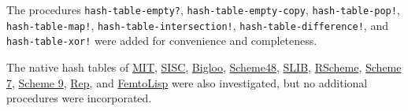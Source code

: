 The procedures \texttt{hash-table-empty?},
\texttt{hash-table-empty-copy}, \texttt{hash-table-pop!},
\texttt{hash-table-map!}, \texttt{hash-table-intersection!},
\texttt{hash-table-difference!}, and \texttt{hash-table-xor!} were added
for convenience and completeness.

The native hash tables of
\href{http://web.mit.edu/scheme_v9.0.1/doc/mit-scheme-ref/Hash-Tables.html}{MIT},
\href{http://sisc-scheme.org/manual/html/ch09.html\#Hashtables}{SISC},
\href{http://www-sop.inria.fr/indes/fp/Bigloo/doc/bigloo-7.html\#Hash-Tables}{Bigloo},
\href{http://s48.org/0.57/manual/s48manual_44.html}{Scheme48},
\href{http://www.cs.indiana.edu/scheme-repository/SCM/slib_2.html\#SEC13}{SLIB},
\href{http://www.rscheme.org/rs/b/0.7.3.4/5/html/c2143.html}{RScheme},
\href{https://ccrma.stanford.edu/software/snd/snd/s7.html\#hashtables}{Scheme
7},
\href{https://github.com/barak/scheme9/blob/master/lib/hash-table.scm}{Scheme
9},
\href{http://www.fifi.org/cgi-bin/info2www?(librep)Hash+Tables}{Rep},
and
\href{https://code.google.com/p/femtolisp/wiki/APIReference}{FemtoLisp}
were also investigated, but no additional procedures were incorporated.
